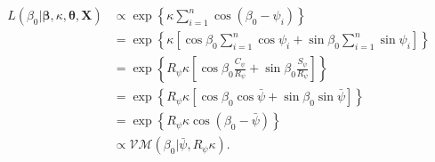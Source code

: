 \documentclass[12pt,a4paper]{article}\usepackage[]{graphicx}\usepackage[]{color}
\begin{document}
\begin{align*}
L(\beta_0 \vert \boldsymbol\beta, \kappa, \boldsymbol\theta, \boldsymbol{X}) & \propto \exp \left\lbrace \kappa \sum_{i=1}^n \cos ( \beta_0 - \psi_i)  \right\rbrace \\
& = \exp \left\lbrace \kappa   \left[ \cos\beta_0 \sum_{i=1}^n \cos\psi_i +  \sin\beta_0 \sum_{i=1}^n \sin\psi_i \right]  \right\rbrace \\
& = \exp \left\lbrace R_{\psi}  \kappa  \left[ \cos\beta_0 \frac{C_{\psi}}{R_{\psi}} +  \sin\beta_0 \frac{S_{\psi}}{R_{\psi}} \right]  \right\rbrace \\
& = \exp \left\lbrace R_{\psi} \kappa   \left[ \cos\beta_0 \cos{\bar\psi} +  \sin\beta_0 \sin{\bar\psi}\right]  \right\rbrace \\
& = \exp \left\lbrace R_{\psi} \kappa \cos \left( \beta_0 - \bar\psi \right)  \right\rbrace \\
& \propto \mathcal{VM}(\beta_0 \vert \bar\psi, R_{\psi} \kappa).
\end{align*}







\end{document}
